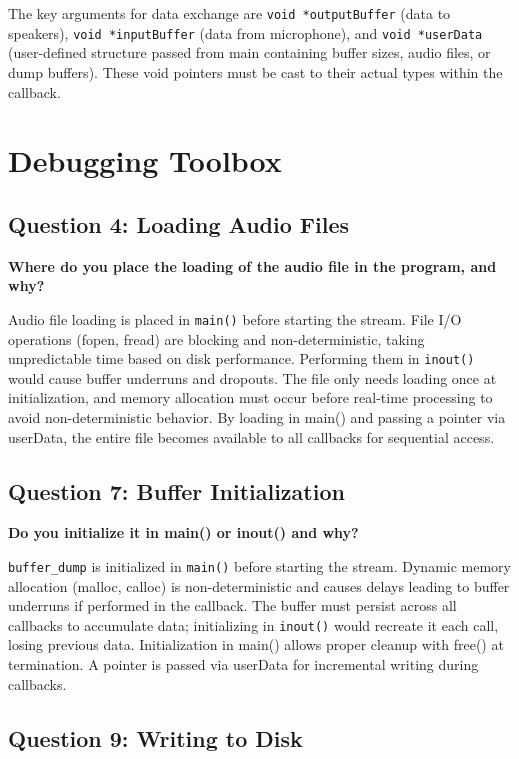 \documentclass[11pt,a4paper]{article}
\begin{document}
The key arguments for data exchange are \texttt{void *outputBuffer} (data to speakers), \texttt{void *inputBuffer} (data from microphone), and \texttt{void *userData} (user-defined structure passed from main containing buffer sizes, audio files, or dump buffers). These void pointers must be cast to their actual types within the callback.

\section{Debugging Toolbox}

\subsection{Question 4: Loading Audio Files}

\textbf{Where do you place the loading of the audio file in the program, and why?}

Audio file loading is placed in \texttt{main()} before starting the stream. File I/O operations (fopen, fread) are blocking and non-deterministic, taking unpredictable time based on disk performance. Performing them in \texttt{inout()} would cause buffer underruns and dropouts. The file only needs loading once at initialization, and memory allocation must occur before real-time processing to avoid non-deterministic behavior. By loading in main() and passing a pointer via userData, the entire file becomes available to all callbacks for sequential access.

\subsection{Question 7: Buffer Initialization}

\textbf{Do you initialize it in main() or inout() and why?}

\texttt{buffer\_dump} is initialized in \texttt{main()} before starting the stream. Dynamic memory allocation (malloc, calloc) is non-deterministic and causes delays leading to buffer underruns if performed in the callback. The buffer must persist across all callbacks to accumulate data; initializing in \texttt{inout()} would recreate it each call, losing previous data. Initialization in main() allows proper cleanup with free() at termination. A pointer is passed via userData for incremental writing during callbacks.

\subsection{Question 9: Writing to Disk}
\end{document}
